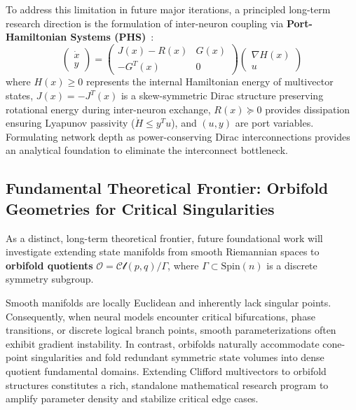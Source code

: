 \documentclass[11pt,a4paper]{article}
\begin{document}
To address this limitation in future major iterations, a principled long-term research direction is the formulation of inter-neuron coupling via \textbf{Port-Hamiltonian Systems (PHS)}~\cite{vanderschaft2014port}:
\begin{equation}
    \begin{pmatrix} \dot{x} \\ y \end{pmatrix} = \begin{pmatrix} J(x) - R(x) & G(x) \\ -G^T(x) & 0 \end{pmatrix} \begin{pmatrix} \nabla H(x) \\ u \end{pmatrix}
\end{equation}
where $H(x) \ge 0$ represents the internal Hamiltonian energy of multivector states, $J(x) = -J^T(x)$ is a skew-symmetric Dirac structure preserving rotational energy during inter-neuron exchange, $R(x) \succeq 0$ provides dissipation ensuring Lyapunov passivity ($\dot{H} \le y^T u$), and $(u, y)$ are port variables. Formulating network depth as power-conserving Dirac interconnections provides an analytical foundation to eliminate the interconnect bottleneck.

\subsection{Fundamental Theoretical Frontier: Orbifold Geometries for Critical Singularities}

As a distinct, long-term theoretical frontier, future foundational work will investigate extending state manifolds from smooth Riemannian spaces to \textbf{orbifold quotients} $\mathcal{O} = \mathcal{Cl}(p, q) / \Gamma$, where $\Gamma \subset \mathrm{Spin}(n)$ is a discrete symmetry subgroup.

Smooth manifolds are locally Euclidean and inherently lack singular points. Consequently, when neural models encounter critical bifurcations, phase transitions, or discrete logical branch points, smooth parameterizations often exhibit gradient instability. In contrast, orbifolds naturally accommodate cone-point singularities and fold redundant symmetric state volumes into dense quotient fundamental domains. Extending Clifford multivectors to orbifold structures constitutes a rich, standalone mathematical research program to amplify parameter density and stabilize critical edge cases.
\end{document}
